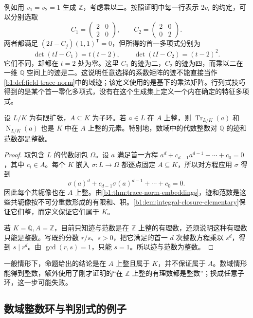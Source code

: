 \ProseParagraphBreak
例如用 \(v_1=v_2=1\) 生成 \(\mathbb Z\)，考虑乘以二。按照证明中每一行表示 \(2v_i\) 的约定，可以分别选取
\[
	C_1=\begin{pmatrix}2&0\\2&0\end{pmatrix},
	\qquad C_2=\begin{pmatrix}2&0\\0&2\end{pmatrix}.
\]
两者都满足 \((2I-C_j)(1,1)^{\mathsf T}=0\)，但所得的首一多项式分别为
\[
	\det(tI-C_1)=t(t-2),\qquad \det(tI-C_2)=(t-2)^2.
\]
它们不同，却都在 \(t=2\) 处为零。这里 \(C_1\) 的迹为二，\(C_2\) 的迹为四，而乘以二在一维 \(\mathbb Q\) 空间上的迹是二。这说明任意选择的系数矩阵的迹不能直接当作\cref{b1:def:field-trace-norm}中的域迹；该定义使用的是基下的乘法矩阵。行列式技巧得到的是某个首一零化多项式，没有在这个生成集上定义一个内在确定的特征多项式。

\begin{proposition}\label{b1:prop:integral-trace-norm}
	设 \(L/K\) 为有限扩张，\(A\subseteq K\) 为子环。若 \(a\in L\) 在 \(A\) 上整，则 \(\operatorname{Tr}_{L/K}(a)\) 和 \(\operatorname{N}_{L/K}(a)\) 也是 \(K\) 中在 \(A\) 上整的元素。特别地，数域中的代数整数对 \(\mathbb Q\) 的迹和范数都是整数。
\end{proposition}
\begin{proof}
	取包含 \(L\) 的代数闭包 \(\Omega\)。设 \(a\) 满足首一方程 \(a^d+c_{d-1}a^{d-1}+\cdots+c_0=0\)，其中 \(c_i\in A\)。每个 \(K\) 嵌入 \(\sigma:L\rightarrow\Omega\) 都逐点固定 \(A\subseteq K\)，所以对方程应用 \(\sigma\) 得到
	\[
		\sigma(a)^d+c_{d-1}\sigma(a)^{d-1}+\cdots+c_0=0.
	\]
	因此每个共轭像也在 \(A\) 上整。由\cref{b1:thm:trace-norm-embeddings}，迹和范数是这些共轭像按不可分重数形成的有限和、积。\cref{b1:lem:integral-closure-elementary}保证它们整，而定义保证它们属于 \(K\)。

	若 \(K=\mathbb Q,A=\mathbb Z\)，目前只知迹与范数是在 \(\mathbb Z\) 上整的有理数，还须说明这种有理数只能是整数。写既约分数 \(r/s\)、\(s>0\)，把它满足的首一 \(d\) 次整数方程乘以 \(s^d\)，得到 \(s\mid r^d\)。由 \(\gcd(r,s)=1\)，只能 \(s=1\)。所以迹与范数为整数。
\end{proof}
一般情形下，命题给出的结论是在 \(A\) 上整且属于 \(K\)，并不保证属于 \(A\)。数域情形能得到整数，额外使用了刚才证明的“在 \(\mathbb Z\) 上整的有理数都是整数”；换成任意子环，这一步可能失败。

\subsection{数域整数环与判别式的例子}
\label{b1:subsec:1804:03}

